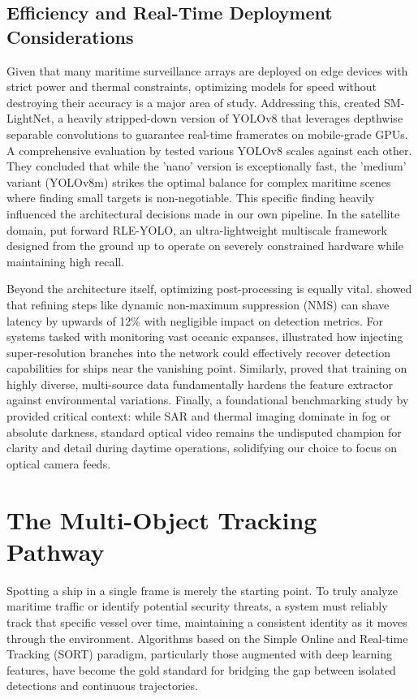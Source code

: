 \subsection{Efficiency and Real-Time Deployment Considerations}
Given that many maritime surveillance arrays are deployed on edge devices with strict power and thermal constraints, optimizing models for speed without destroying their accuracy is a major area of study. Addressing this, \cite{Gao2024} created SM-LightNet, a heavily stripped-down version of YOLOv8 that leverages depthwise separable convolutions to guarantee real-time framerates on mobile-grade GPUs. A comprehensive evaluation by \cite{Liu2025b} tested various YOLOv8 scales against each other. They concluded that while the 'nano' version is exceptionally fast, the 'medium' variant (YOLOv8m) strikes the optimal balance for complex maritime scenes where finding small targets is non-negotiable. This specific finding heavily influenced the architectural decisions made in our own pipeline. In the satellite domain, \cite{Xu2025} put forward RLE-YOLO, an ultra-lightweight multiscale framework designed from the ground up to operate on severely constrained hardware while maintaining high recall.

Beyond the architecture itself, optimizing post-processing is equally vital. \cite{Chen2023} showed that refining steps like dynamic non-maximum suppression (NMS) can shave latency by upwards of 12\% with negligible impact on detection metrics. For systems tasked with monitoring vast oceanic expanses, \cite{Gong2024} illustrated how injecting super-resolution branches into the network could effectively recover detection capabilities for ships near the vanishing point. Similarly, \cite{Huang2024} proved that training on highly diverse, multi-source data fundamentally hardens the feature extractor against environmental variations. Finally, a foundational benchmarking study by \cite{Nambiar2022} provided critical context: while SAR and thermal imaging dominate in fog or absolute darkness, standard optical video remains the undisputed champion for clarity and detail during daytime operations, solidifying our choice to focus on optical camera feeds.

\section{The Multi-Object Tracking Pathway}
Spotting a ship in a single frame is merely the starting point. To truly analyze maritime traffic or identify potential security threats, a system must reliably track that specific vessel over time, maintaining a consistent identity as it moves through the environment. Algorithms based on the Simple Online and Real-time Tracking (SORT) paradigm, particularly those augmented with deep learning features, have become the gold standard for bridging the gap between isolated detections and continuous trajectories.

